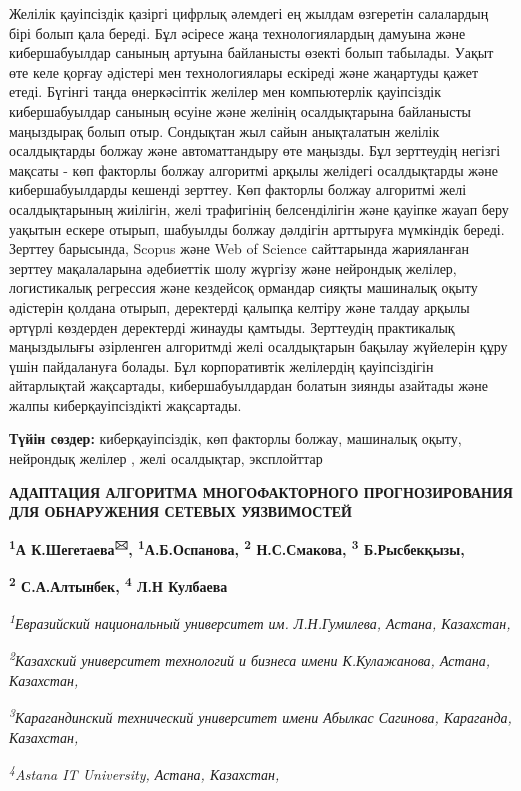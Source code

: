 \documentclass[
]{article}
\begin{document}
Желілік қауіпсіздік қазіргі цифрлық әлемдегі ең жылдам өзгеретін
салалардың бірі болып қала береді. Бұл әсіресе жаңа технологиялардың
дамуына және кибершабуылдар санының артуына байланысты өзекті болып
табылады. Уақыт өте келе қорғау әдістері мен технологиялары ескіреді
және жаңартуды қажет етеді. Бүгінгі таңда өнеркәсіптік желілер мен
компьютерлік қауіпсіздік кибершабуылдар санының өсуіне және желінің
осалдықтарына байланысты маңыздырақ болып отыр. Сондықтан жыл сайын
анықталатын желілік осалдықтарды болжау және автоматтандыру өте маңызды.
Бұл зерттеудің негізгі мақсаты - көп факторлы болжау алгоритмі арқылы
желідегі осалдықтарды және кибершабуылдарды кешенді зерттеу. Көп
факторлы болжау алгоритмі желі осалдықтарының жиілігін, желі трафигінің
белсенділігін және қауіпке жауап беру уақытын ескере отырып, шабуылды
болжау дәлдігін арттыруға мүмкіндік береді. Зерттеу барысында, Scopus
және Web of Science сайттарында жарияланған зерттеу мақалаларына
әдебиеттік шолу жүргізу және нейрондық желілер, логистикалық регрессия
және кездейсоқ ормандар сияқты машиналық оқыту әдістерін қолдана отырып,
деректерді қалыпқа келтіру және талдау арқылы әртүрлі көздерден
деректерді жинауды қамтыды. Зерттеудің практикалық маңыздылығы
әзірленген алгоритмді желі осалдықтарын бақылау жүйелерін құру үшін
пайдалануға болады. Бұл корпоративтік желілердің қауіпсіздігін
айтарлықтай жақсартады, кибершабуылдардан болатын зиянды азайтады және
жалпы киберқауіпсіздікті жақсартады.

\textbf{Түйін сөздер:} киберқауіпсіздік, көп факторлы болжау, машиналық
оқыту, нейрондық желілер , желі осалдықтар, эксплойттар

\textbf{АДАПТАЦИЯ АЛГОРИТМА МНОГОФАКТОРНОГО ПРОГНОЗИРОВАНИЯ ДЛЯ
ОБНАРУЖЕНИЯ СЕТЕВЫХ УЯЗВИМОСТЕЙ}

\textbf{\textsuperscript{1}А К.Шегетаева\textsuperscript{🖂},
\textsuperscript{1}А.Б.Оспанова, \textsuperscript{2} Н.С.Смакова,
\textsuperscript{3} Б.Рысбекқызы,}

\textbf{\textsuperscript{2} С.А.Алтынбек, \textsuperscript{4} Л.Н
Кулбаева}

\emph{\textsuperscript{1}Евразийский национальный университет им.
Л.Н.Гумилева, Астана, Казахстан,}

\emph{\textsuperscript{2}Казахский университет технологий и бизнеса
имени К.Кулажанова, Астана, Казахстан,}

\emph{\textsuperscript{3}Карагандинский технический университет имени
Абылкас Сагинова, Караганда, Казахстан,}

\emph{\textsuperscript{4}Astana IT University, Астана, Казахстан,}
\end{document}
